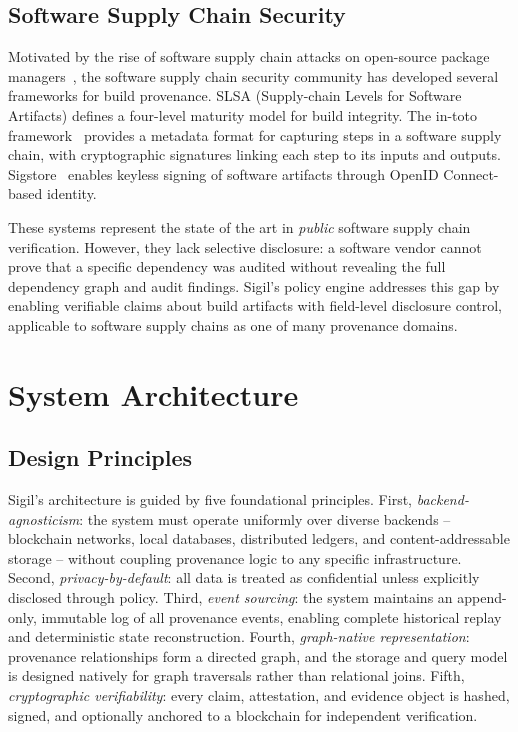 \documentclass[conference]{IEEEtran}
\begin{document}
\subsection{Software Supply Chain Security}

Motivated by the rise of software supply chain attacks on open-source package
managers~\cite{duan2021}, the software supply chain security community has
developed several frameworks
for build provenance.  SLSA (Supply-chain Levels for Software Artifacts)
defines a four-level maturity model for build integrity.  The in-toto
framework~\cite{torres-arias2019} provides a metadata format for capturing
steps in a software supply chain, with cryptographic signatures linking each
step to its inputs and outputs.  Sigstore~\cite{lucovsky2022} enables
keyless signing of software artifacts through OpenID Connect-based identity.

These systems represent the state of the art in \emph{public} software supply
chain verification.  However, they lack selective disclosure: a software
vendor cannot prove that a specific dependency was audited without revealing
the full dependency graph and audit findings.  Sigil's policy engine addresses
this gap by enabling verifiable claims about build artifacts with field-level
disclosure control, applicable to software supply chains as one of many
provenance domains.


\section{System Architecture}

\subsection{Design Principles}

Sigil's architecture is guided by five foundational principles.  First,
\emph{backend-agnosticism}: the system must operate uniformly over diverse
backends -- blockchain networks, local databases, distributed ledgers, and
content-addressable storage -- without coupling provenance logic to any
specific infrastructure.  Second, \emph{privacy-by-default}: all data is
treated as confidential unless explicitly disclosed through policy.  Third,
\emph{event sourcing}: the system maintains an append-only, immutable log of
all provenance events, enabling complete historical replay and deterministic
state reconstruction.  Fourth, \emph{graph-native representation}: provenance
relationships form a directed graph, and the storage and query model is
designed natively for graph traversals rather than relational joins.  Fifth,
\emph{cryptographic verifiability}: every claim, attestation, and evidence
object is hashed, signed, and optionally anchored to a blockchain for
independent verification.
\end{document}

